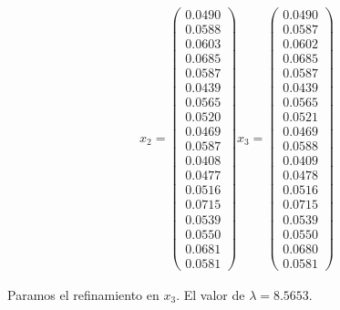 \begin{equation*}
\begin{array}{cccc}
	x_{2} = 
	\left( \begin{array}{c}
    0.0490\\
    0.0588\\
    0.0603\\
    0.0685\\
    0.0587\\
    0.0439\\
    0.0565\\
    0.0520\\
    0.0469\\
    0.0587\\
    0.0408\\
    0.0477\\
    0.0516\\
    0.0715\\
    0.0539\\
    0.0550\\
    0.0681\\
    0.0581
	\end{array}\right)	
	
	x_{3} = 
	\left( \begin{array}{c}
    0.0490\\
    0.0587\\
    0.0602\\
    0.0685\\
    0.0587\\
    0.0439\\
    0.0565\\
    0.0521\\
    0.0469\\
    0.0588\\
    0.0409\\
    0.0478\\
    0.0516\\
    0.0715\\
    0.0539\\
    0.0550\\
    0.0680\\
    0.0581
	\end{array}\right)
		
	
	\end{array}
	\end{equation*}
	
	Paramos el refinamiento en $x_{3}$. El valor de $\lambda = 8.5653$.
	
